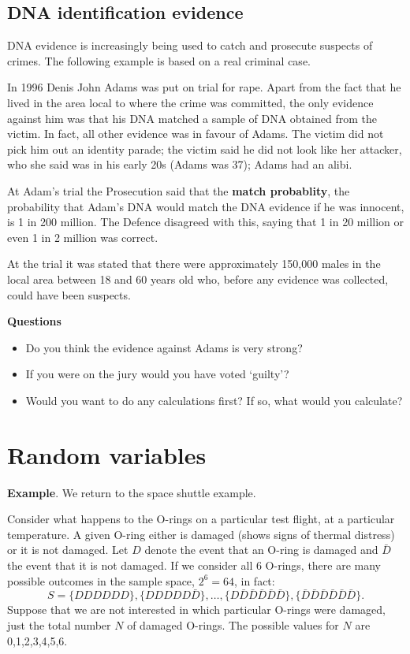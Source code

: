 \documentclass[
  11pt,
  british,
  openany, a4paper]{book}
\providecommand{\tightlist}{%
  \setlength{\itemsep}{0pt}\setlength{\parskip}{0pt}}
\begin{document}
\hypertarget{dna-identification-evidence}{%
\section{DNA identification evidence}\label{dna-identification-evidence}}

DNA evidence is increasingly being used to catch and prosecute suspects of crimes. The following example is based on a real criminal case.

In 1996 Denis John Adams was put on trial for rape. Apart from the fact that he lived in the area local to where the crime was committed, the only evidence against him was that his DNA matched a sample of DNA obtained from the victim.
In fact, all other evidence was in favour of Adams. The victim did not pick him out an identity parade; the victim said he did not look like her attacker, who she said was in his early 20s (Adams was 37); Adams had an alibi.

At Adam's trial the Prosecution said that the \textbf{match probablity}, the probability that Adam's DNA would match the DNA evidence if he was innocent, is 1 in 200 million. The Defence disagreed with this, saying that 1 in 20 million or even 1 in 2 million was correct.

At the trial it was stated that there were approximately 150,000 males in the local area between 18 and 60 years old who, before any evidence was collected, could have been suspects.

\textbf{Questions}

\begin{itemize}
\tightlist
\item
  Do you think the evidence against Adams is very strong?
\item
  If you were on the jury would you have voted `guilty'?
\item
  Would you want to do any calculations first? If so, what would you calculate?
\end{itemize}

\hypertarget{rvs}{%
\chapter{Random variables}\label{rvs}}

\textbf{Example}. We return to the space shuttle example.

Consider what happens to the O-rings on a particular test flight, at a particular temperature. A given O-ring either is damaged (shows signs of thermal distress) or it is not damaged. Let \(D\) denote the event that an O-ring is damaged and \(\bar{D}\) the event that it is not damaged. If we consider all 6 O-rings, there are many possible outcomes in the sample space, \(2^6=64\), in fact:
\[ S= \{DDDDDD\}, \{DDDDD\bar{D}\}, \ldots, \{D\bar{D}\bar{D}\bar{D}\bar{D}\bar{D}\}, 
\{\bar{D}\bar{D}\bar{D}\bar{D}\bar{D}\bar{D}\}. \]
Suppose that we are not interested in which particular O-rings were damaged, just the total number \(N\) of damaged O-rings. The possible values for \(N\) are 0,1,2,3,4,5,6.
\end{document}
